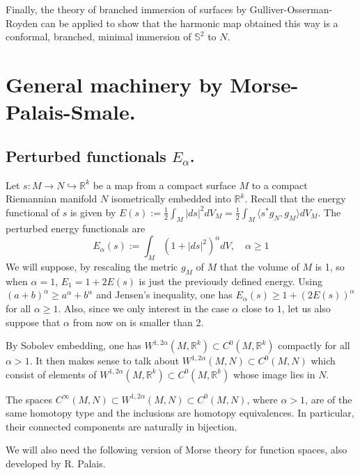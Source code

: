 Finally, the theory of branched immersion of surfaces by Gulliver-Osserman-Royden
\cite{gulliver_theory_1973} can be applied to show that the harmonic map obtained this way
is a conformal, branched, minimal immersion of \(\mathbb{S}^2\) to \(N\).

\section{General machinery by Morse-Palais-Smale.}
\label{sec:org4d8655c}

\subsection{Perturbed functionals \(E_\alpha\).}
\label{sec:orgb908691}

Let \(s: M \longrightarrow N \hookrightarrow \mathbb{R}^k\) be a map from a compact
surface \(M\) to a compact Riemannian manifold \(N\) isometrically embedded into \(\mathbb{R}^k\). Recall that the energy functional of \(s\) is given by \(E(s):=
\frac{1}{2}\int_M |ds|^2 dV_M = \frac{1}{2}\int_M \langle s^* g_N, g_M \rangle dV_M\). The perturbed energy functionals are
\[
 E_\alpha(s) := \int_M\left(1 + |ds|^2\right)^\alpha dV,\quad \alpha \geq 1
\]
We will suppose, by rescaling the metric \(g_M\) of \(M\) that the volume of \(M\)
is 1, so when \(\alpha=1\), \(E_1 =  1+ 2E(s)\) is just the previously defined energy. Using \((a+b)^\alpha \geq a^\alpha + b^\alpha\) and Jensen's inequality, one has \(E_\alpha(s) \geq 1 + (2E(s))^\alpha\) for all \(\alpha \geq 1\). Also, since we only
interest in the case \(\alpha\) close to \(1\), let us also suppose that \(\alpha\) from now on is smaller than 2.

By Sobolev embedding, one has \(W^{1,2\alpha}(M, \mathbb{R}^k) \subset C^0(M,
\mathbb{R}^k)\) compactly for all \(\alpha >1\). It then makes sense to talk about \(W^{1,2\alpha}(M,N) \subset C^0(M,N)\) which consist of elements of \(W^{1,2\alpha}(M,
\mathbb{R}^k)\subset C^0(M, \mathbb{R}^k)\) whose image lies in \(N\).

\begin{theorem}[Palais]
\label{thm:Palais-1}
The spaces \(C^\infty (M,N)\subset W^{1,2\alpha}(M,N)\subset C^0(M,N)\), where \(\alpha>1\), are
of the same homotopy type and the inclusions are homotopy equivalences. In particular,
their connected components are naturally in bijection.
\end{theorem}

We will also need the following version of Morse theory for function spaces, also
developed by R. Palais.

